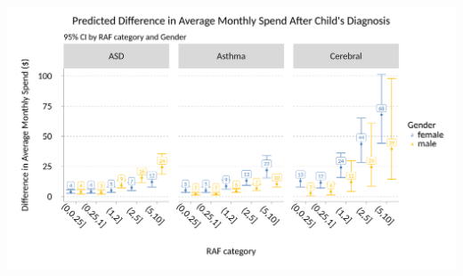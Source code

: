\documentclass[xcolor=x11names,compress]{beamer}
\renewcommand{\(}{\begin{columns}}
\renewcommand{\)}{\end{columns}}
\newcommand{\<}[1]{\begin{column}{#1}}
\renewcommand{\>}{\end{column}}
\begin{document}
\begin{frame}
\includegraphics[width=\linewidth]{../figures/spend_diff_ASD_Cerebral.png}
\end{frame}
\end{document}
